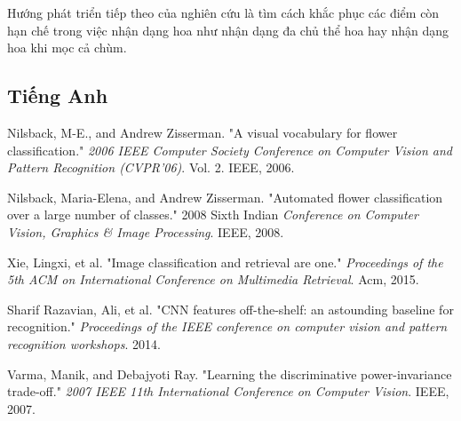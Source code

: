 \documentclass[12pt]{report}
\begin{document}
		Hướng phát triển tiếp theo của nghiên cứu là  tìm cách khắc phục các điểm còn hạn chế trong việc nhận dạng hoa như nhận dạng đa chủ thể hoa hay nhận dạng hoa khi mọc cả chùm.															
																																																																										
		\begin{thebibliography}{9}
																																																																																																			
			\section*{Tiếng Anh}
																																																																																																
			Nilsback, M-E., and Andrew Zisserman. "A visual vocabulary for flower classification." \textit{2006 IEEE Computer Society Conference on Computer Vision and Pattern Recognition (CVPR'06)}. Vol. 2. IEEE, 2006.													
																																																																																																			
			Nilsback, Maria-Elena, and Andrew Zisserman. "Automated flower classification over a large number of classes." 2008 Sixth Indian \textit{Conference on Computer Vision, Graphics \& Image Processing}. IEEE, 2008.
																																																																																																
			Xie, Lingxi, et al. "Image classification and retrieval are one." \textit{Proceedings of the 5th ACM on International Conference on Multimedia Retrieval}. Acm, 2015.
																																																																																																
			Sharif Razavian, Ali, et al. "CNN features off-the-shelf: an astounding baseline for recognition." \textit{Proceedings of the IEEE conference on computer vision and pattern recognition workshops}. 2014.
																																																																																															
			Varma, Manik, and Debajyoti Ray. "Learning the discriminative power-invariance trade-off."  \textit{2007 IEEE 11th International Conference on Computer Vision}. IEEE, 2007.
																																																																																										

\end{thebibliography}
\end{document}
